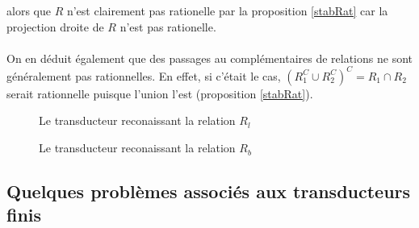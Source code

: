 \documentclass{scrartcl}
\begin{document}
\begin{flushleft}
alors que $R$ n'est clairement pas rationelle par la proposition \ref{stabRat} car la projection droite de $R$ n'est pas rationelle.
\\~\\
On en déduit également que des passages au complémentaires de relations ne sont généralement pas rationnelles. En effet, si
c'était le cas,
$(R_1^C \cup R_2^C)^C  = R_1 \cap R_2$ serait rationnelle puisque l'union l'est (proposition \ref{stabRat}).
\begin{figure}[h] 
    \caption{Le transducteur reconaissant la relation $R_l$}\label{autoRl}
    \begin{center}
    \end{center}
\end{figure}

\begin{figure}[h] 
    \caption{Le transducteur reconaissant la relation $R_b$}\label{autoRb}
    \begin{center}
    \end{center}
\end{figure}

\subsection{Quelques problèmes associés aux transducteurs finis}


\end{flushleft}
\end{document}
